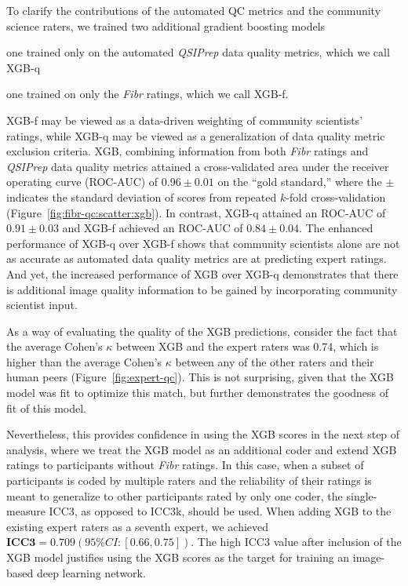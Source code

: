 \documentclass[fleqn,10pt,inline]{wlscirep}
\begin{document}
To clarify the contributions of the automated QC metrics and the community
science raters, we trained two additional gradient boosting models
\begin{enumerate*}[%
    label=(\roman*),%
    before=\unskip{: },%
    itemjoin={{, }},%
    itemjoin*={{ and }}]
    \item one trained only on the automated \emph{QSIPrep} data quality metrics, which we
    call XGB-q
    \item one trained on only the \emph{Fibr} ratings, which we call XGB-f.
\end{enumerate*}
XGB-f may be viewed as a data-driven weighting of community scientists' ratings,
while XGB-q may be viewed as a generalization of data quality metric exclusion criteria.
XGB, combining information from both \emph{Fibr} ratings and \emph{QSIPrep} data quality
metrics attained a cross-validated area under the receiver operating curve
(ROC-AUC) of $0.96 \pm 0.01$ on the ``gold standard,'' where the $\pm$ indicates
the standard deviation of scores from repeated $k$-fold cross-validation
(Figure~\ref{fig:fibr-qc:scatter:xgb}). In contrast, XGB-q attained an ROC-AUC of
$0.91 \pm 0.03$ and XGB-f achieved an ROC-AUC of $0.84 \pm 0.04$.
The enhanced
performance of XGB-q over XGB-f shows that community scientists alone are not as
accurate as automated data quality metrics are at predicting expert ratings. And yet, the
increased performance of XGB over XGB-q demonstrates that there is additional
image quality information to be gained by incorporating community scientist input.

As a way of evaluating the quality of the XGB predictions, consider the fact
that the average Cohen's $\kappa$ between XGB and the expert raters was 0.74,
which is higher than the average Cohen's $\kappa$ between any of the other raters
and their human peers (Figure~\ref{fig:expert-qc}). This is not surprising,
given that the XGB model was fit to optimize this match, but further
demonstrates the goodness of fit of this model.

Nevertheless, this provides confidence in using the XGB scores in the next step of analysis, where we treat the XGB model as an additional coder and extend XGB ratings to participants without \emph{Fibr} ratings.
In this case, when a subset of participants is coded by multiple raters and the
reliability of their ratings is meant to generalize to other participants rated by
only one coder, the single-measure ICC3, as opposed to ICC3k, should be used. When adding XGB to the
existing expert raters as a seventh expert, we achieved
$\textbf{ICC3} = 0.709 (95\% CI: [0.66, 0.75])$. 
The high ICC3 value after inclusion of the XGB model justifies using the XGB scores as the target for training an image-based deep learning
network.
\end{document}
